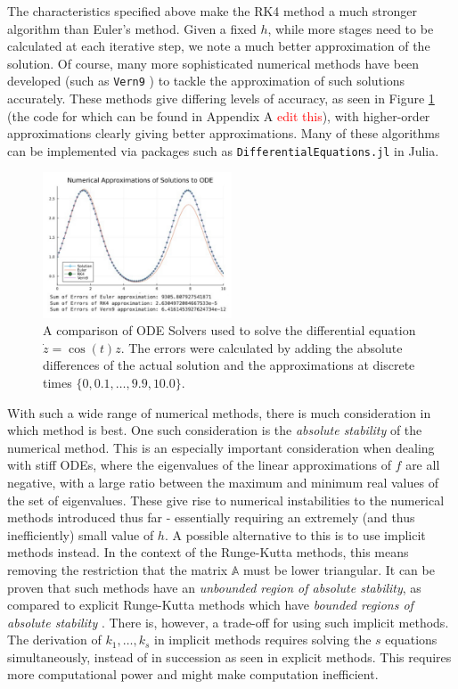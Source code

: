 \documentclass[a4paper,11pt,titlepage]{article}
\theoremstyle{definition}
\theoremstyle{plain}
\theoremstyle{remark}
\begin{document}
The characteristics specified above make the RK4 method a much stronger algorithm than Euler's method. Given a fixed $h$, while more stages need to be calculated at each iterative step, we note a much better approximation of the solution. Of course, many more sophisticated numerical methods have been developed (such as \texttt{Vern9} \cite{verner2010}) to tackle the approximation of such solutions accurately. These methods give differing levels of accuracy, as seen in Figure \ref{fig:odesolver} (the code for which can be found in Appendix A \textcolor{red}{edit this}), with higher-order approximations clearly giving better approximations. Many of these algorithms can be implemented via packages such as \texttt{DifferentialEquations.jl} in Julia.

\begin{figure}
    \centering
    \includegraphics[width=0.5\textwidth]{report/figures/ODESolvers.png}
    \caption{A comparison of ODE Solvers used to solve the differential equation $\dot{z} = \cos(t)z$. The errors were calculated by adding the absolute differences of the actual solution and the approximations at discrete times $\{0, 0.1, \dots, 9.9, 10.0\}$.}
    \label{fig:odesolver}
\end{figure}

With such a wide range of numerical methods, there is much consideration in which method is best. One such consideration is the \textit{absolute stability} of the numerical method. This is an especially important consideration when dealing with stiff ODEs, where the eigenvalues of the linear approximations of $f$ are all negative, with a large ratio between the maximum and minimum real values of the set of eigenvalues. These give rise to numerical instabilities to the numerical methods introduced thus far - essentially requiring an extremely (and thus inefficiently) small value of $h$. A possible alternative to this is to use implicit methods instead. In the context of the Runge-Kutta methods, this means removing the restriction that the matrix $\mathbb{A}$ must be lower triangular. It can be proven that such methods have an \textit{unbounded region of absolute stability}, as compared to explicit Runge-Kutta methods which have \textit{bounded regions of absolute stability} \cite{sulimayers2003}. There is, however, a trade-off for using such implicit methods. The derivation of $k_1, \dots, k_s$ in implicit methods requires solving the $s$ equations simultaneously, instead of in succession as seen in explicit methods. This requires more computational power and might make computation inefficient.
\end{document}
